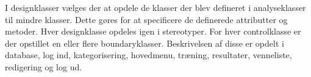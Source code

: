 I designklasser vælges der at opdele de klasser der blev defineret i analyseklasser til mindre klasser. Dette gøres for at specificere de definerede attributter og metoder. Hver designklasse opdeles igen i stereotyper. For hver controlklasse er der opstillet en eller flere boundaryklasser. Beskrivelsen af disse er opdelt i database, log ind, kategorisering, hovedmenu, træning, resultater, venneliste, redigering og log ud. 